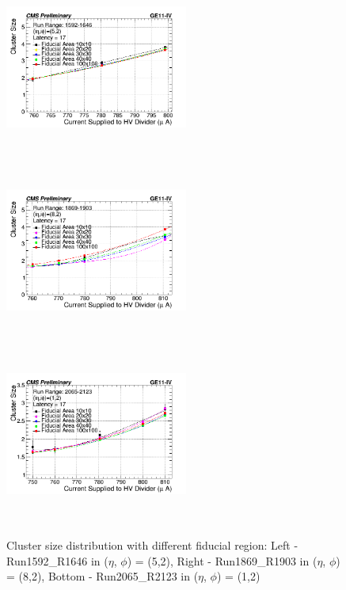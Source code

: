 \begin{figure}[!htbp]
    \begin{center}

      \includegraphics[width=6cm,height=6cm]{figures/GEM/CurrentvsClusterSizeR1592R1646.png}
      \includegraphics[width=6cm,height=6cm]{figures/GEM/CurrentvsClusterSizeR1869R1903.png}
      \includegraphics[width=6cm,height=6cm]{figures/GEM/CurrentvsClusterSizeR2065R2123.png}
    \end{center}
    \caption{Cluster size distribution with different fiducial region: Left - Run1592\_R1646 in ($\eta$, $\phi$) = (5,2), Right - Run1869\_R1903 in ($\eta$, $\phi$) = (8,2), Bottom - Run2065\_R2123 in ($\eta$, $\phi$) = (1,2)}
  \label{fig:CSDfiducialregion}
\end{figure}
